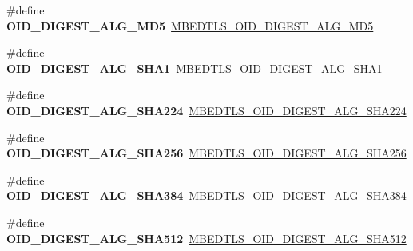 \begin{DoxyCompactItemize}
\item 
\mbox{\label{compat-1_83_8h_a83d17239c3b3b4ae90feaff89228a936}} 
\#define {\bfseries O\+I\+D\+\_\+\+D\+I\+G\+E\+S\+T\+\_\+\+A\+L\+G\+\_\+\+M\+D5}~\mbox{\hyperlink{oid_8h_a48fad9d4b63fd94ea67b8dca0dd1933b}{M\+B\+E\+D\+T\+L\+S\+\_\+\+O\+I\+D\+\_\+\+D\+I\+G\+E\+S\+T\+\_\+\+A\+L\+G\+\_\+\+M\+D5}}
\item 
\mbox{\label{compat-1_83_8h_aacf90b59c73d2cc5d724079e4b2d60a6}} 
\#define {\bfseries O\+I\+D\+\_\+\+D\+I\+G\+E\+S\+T\+\_\+\+A\+L\+G\+\_\+\+S\+H\+A1}~\mbox{\hyperlink{oid_8h_a0d6d3de544d2701dcc180fe538f830a0}{M\+B\+E\+D\+T\+L\+S\+\_\+\+O\+I\+D\+\_\+\+D\+I\+G\+E\+S\+T\+\_\+\+A\+L\+G\+\_\+\+S\+H\+A1}}
\item 
\mbox{\label{compat-1_83_8h_a20b1e7ad3ca31e8a6ace664303ca3798}} 
\#define {\bfseries O\+I\+D\+\_\+\+D\+I\+G\+E\+S\+T\+\_\+\+A\+L\+G\+\_\+\+S\+H\+A224}~\mbox{\hyperlink{oid_8h_a9901a9fc6c04cd3396bfce7578fe8782}{M\+B\+E\+D\+T\+L\+S\+\_\+\+O\+I\+D\+\_\+\+D\+I\+G\+E\+S\+T\+\_\+\+A\+L\+G\+\_\+\+S\+H\+A224}}
\item 
\mbox{\label{compat-1_83_8h_ae981ca44d5353aa8dd4fcf96fa33446f}} 
\#define {\bfseries O\+I\+D\+\_\+\+D\+I\+G\+E\+S\+T\+\_\+\+A\+L\+G\+\_\+\+S\+H\+A256}~\mbox{\hyperlink{oid_8h_a0c139de494bd65ff1f5b3fb8460d66f2}{M\+B\+E\+D\+T\+L\+S\+\_\+\+O\+I\+D\+\_\+\+D\+I\+G\+E\+S\+T\+\_\+\+A\+L\+G\+\_\+\+S\+H\+A256}}
\item 
\mbox{\label{compat-1_83_8h_a4d3fb122020645d9615c8032f8dd0bbd}} 
\#define {\bfseries O\+I\+D\+\_\+\+D\+I\+G\+E\+S\+T\+\_\+\+A\+L\+G\+\_\+\+S\+H\+A384}~\mbox{\hyperlink{oid_8h_a009bb4ed3a37a07ac3b56e4e7368c33d}{M\+B\+E\+D\+T\+L\+S\+\_\+\+O\+I\+D\+\_\+\+D\+I\+G\+E\+S\+T\+\_\+\+A\+L\+G\+\_\+\+S\+H\+A384}}
\item 
\mbox{\label{compat-1_83_8h_a2aba5bb309a10445a58918288a84c27c}} 
\#define {\bfseries O\+I\+D\+\_\+\+D\+I\+G\+E\+S\+T\+\_\+\+A\+L\+G\+\_\+\+S\+H\+A512}~\mbox{\hyperlink{oid_8h_a49a6e10222d13db7f7a88dfc42b6a036}{M\+B\+E\+D\+T\+L\+S\+\_\+\+O\+I\+D\+\_\+\+D\+I\+G\+E\+S\+T\+\_\+\+A\+L\+G\+\_\+\+S\+H\+A512}}
\item 
\mbox{\label{compat-1_83_8h_a7cf4314fd28bd9af854b40472f0274aa}} 

\end{DoxyCompactItemize}
